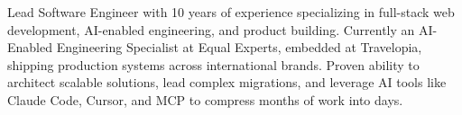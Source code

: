 

\begin{cvparagraph}

Lead Software Engineer with 10 years of experience specializing in full-stack web development, AI-enabled engineering, and product building. Currently an AI-Enabled Engineering Specialist at Equal Experts, embedded at Travelopia, shipping production systems across international brands. Proven ability to architect scalable solutions, lead complex migrations, and leverage AI tools like Claude Code, Cursor, and MCP to compress months of work into days.
\end{cvparagraph}
